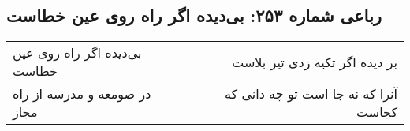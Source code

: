 \begin{center}
\section*{رباعی شماره ۲۵۳: بی‌دیده اگر راه روی عین خطاست}
\label{sec:0253}
\begin{longtable}{l p{0.5cm} r}
بی‌دیده اگر راه روی عین خطاست
&&
بر دیده اگر تکیه زدی تیر بلاست
\\
در صومعه و مدرسه از راه مجاز
&&
آنرا که نه جا است تو چه دانی که کجاست
\\
\end{longtable}
\end{center}
